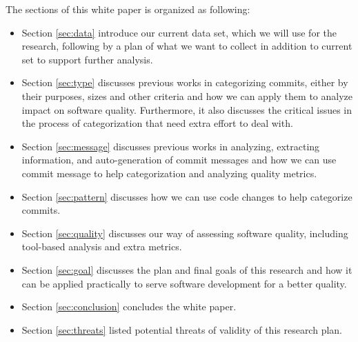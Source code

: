The sections of this white paper is organized as following:
\begin{itemize}
    \item Section \ref{sec:data} introduce our current data set, which we will use for the research, following by a plan of what we want to collect in addition to current set to support further analysis.
    \item Section \ref{sec:type} discusses previous works in categorizing commits, either by their purposes, sizes and other criteria and how we can apply them to analyze impact on software quality. Furthermore, it also discusses the critical issues in the process of categorization that need extra effort to deal with.
    \item Section \ref{sec:message} discusses previous works in analyzing, extracting information, and auto-generation of commit messages and how we can use commit message to help categorization and analyzing quality metrics.
    \item Section \ref{sec:pattern} discusses how we can use code changes to help categorize commits.
    \item Section \ref{sec:quality} discusses our way of assessing software quality, including tool-based analysis and extra metrics.
    \item Section \ref{sec:goal} discusses the plan and final goals of this research and how it can be applied practically to serve software development for a better quality.
    \item Section \ref{sec:conclusion} concludes the white paper.
    \item Section \ref{sec:threats} listed potential threats of validity of this research plan.
\end{itemize}


